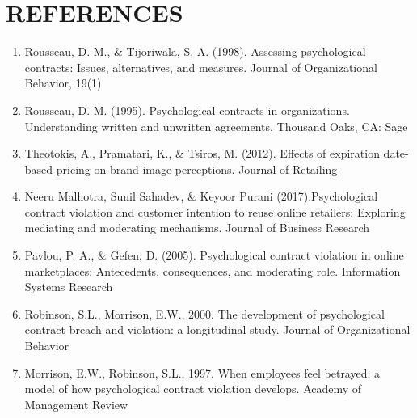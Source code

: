 \documentclass[a4paper, 14pt]{extarticle}
\begin{document}
{\section{REFERENCES}
\begin{enumerate}
\item Rousseau, D. M., \& Tijoriwala, S. A. (1998). Assessing psychological contracts: Issues, alternatives, and measures. Journal of Organizational Behavior, 19(1)%
\item Rousseau, D. M. (1995). Psychological contracts in organizations. Understanding written and unwritten agreements. Thousand Oaks, CA: Sage
\item Theotokis, A., Pramatari, K., \& Tsiros, M. (2012). Effects of expiration date-based pricing on brand image perceptions. Journal of Retailing%
\item Neeru Malhotra, Sunil Sahadev, \& Keyoor Purani (2017).Psychological contract violation and customer intention to reuse online retailers: Exploring mediating and moderating mechanisms. Journal of Business Research%
\item Pavlou, P. A., \& Gefen, D. (2005). Psychological contract violation in online marketplaces: Antecedents, consequences, and moderating role. Information Systems Research%
\item Robinson, S.L., Morrison, E.W., 2000. The development of psychological contract breach and violation: a longitudinal study. Journal of Organizational Behavior %
\item Morrison, E.W., Robinson, S.L., 1997. When employees feel betrayed: a model of how psychological contract violation develops. Academy of Management Review%

\end{enumerate}}
\end{document}
